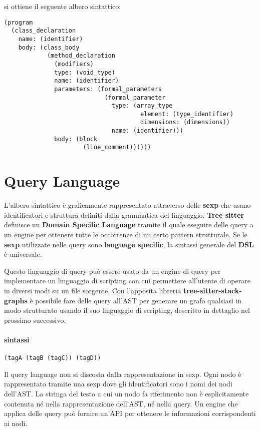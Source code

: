 si ottiene il seguente albero sintattico:

\begin{lstlisting}
(program
  (class_declaration
    name: (identifier)
    body: (class_body
            (method_declaration
              (modifiers)
              type: (void_type)
              name: (identifier)
              parameters: (formal_parameters
                            (formal_parameter
                              type: (array_type
                                      element: (type_identifier)
                                      dimensions: (dimensions))
                              name: (identifier)))
              body: (block
                      (line_comment))))))
\end{lstlisting}

\section{Query Language}

L'albero sintattico \`e graficamente rappresentato attraverso delle \textbf{sexp} che usano identificatori e struttura definiti dalla grammatica del linguaggio.
\textbf{Tree sitter} definisce un \textbf{Domain Specific Language} \cite{TreeSitterQuerySyntax} tramite il quale eseguire delle query a un engine per ottenere tutte le occorrenze di un certo pattern strutturale.
Se le \textbf{sexp} utilizzate nelle query sono \textbf{language specific}, la sintassi generale del \textbf{DSL} \`e universale.

Questo linguaggio di query pu\`o essere usato da un engine di query per implementare un linguaggio di scripting con cui permettere all'utente di operare in diversi modi su un file sorgente.
Con l'apposita libreria \textbf{tree-sitter-stack-graphs} \`e possibile fare delle query all'AST per generare un grafo qualsiasi in modo strutturato usando il suo linguaggio di scripting, descritto in dettaglio nel prossimo successivo.

\paragraph{sintassi}

\begin{lstlisting}
(tagA (tagB (tagC)) (tagD))
\end{lstlisting}

Il query language non si discosta dalla rappresentazione in sexp.
Ogni nodo \`e rappresentato tramite una sexp dove gli identificatori sono i nomi dei nodi dell'AST.
La stringa del testo a cui un nodo fa riferimento non \`e esplicitamente contenuta n\'e nella rappresentazione dell'AST, n\'e nella query.
Un engine che applica delle query pu\`o fornire un'API per ottenere le informazioni corrispondenti ai nodi.

